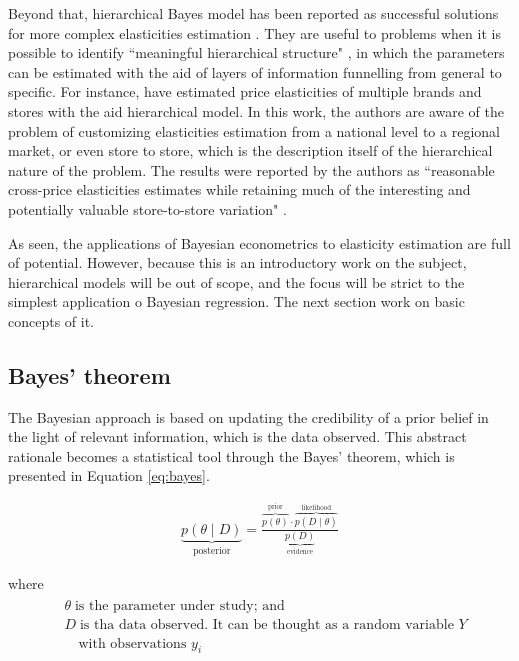 Beyond that, hierarchical Bayes model has been reported as successful solutions for more complex elasticities estimation \citep{liu2009}. They are useful to problems when it is possible to identify ``meaningful hierarchical structure" \citep[p.~221]{kruschke2014}, in which the parameters can be estimated with the aid of layers of information funnelling from general to specific. For instance, \cite{montgomery1999} have estimated price elasticities of multiple brands and stores with the aid hierarchical model. In this work, the authors are aware of the problem of customizing elasticities estimation from a national level to a regional market, or even store to store, which is the description itself of the hierarchical nature of the problem. The results were reported by the authors as ``reasonable cross-price elasticities estimates while retaining much of the interesting and potentially valuable store-to-store variation" \citep[p.~414]{montgomery1999}. 

As seen, the applications of Bayesian econometrics to elasticity estimation are full of potential. However, because this is an introductory work on the subject,  hierarchical models will be out of scope, and the focus will be strict to the simplest application o Bayesian regression. The next section work on basic concepts of it. 

\subsection{Bayes' theorem}

The Bayesian approach is based on updating the credibility of a prior belief in the light of relevant information, which is the data observed. This abstract rationale becomes a statistical tool through the Bayes' theorem, which is presented in Equation \ref{eq:bayes}.


\begin{align}
\label{eq:bayes}
  \underbrace{p(\theta \mid D)}_\text{posterior} =  \frac{\overbrace{p(\theta)}^\text{prior} \cdot \overbrace{p(D \mid \theta)}^\text{likelihood}}{\underbrace{p(D)}_\text{evidence}}
\end{align}


where 
\begin{align*}
\begin{split}
&\theta \; \text{is the parameter under study; and} \\
&D \; \text{is tha data observed. It can be thought as a random variable $Y$} \\
& \quad \text{with observations $y_i$}
\end{split}
\end{align*}


